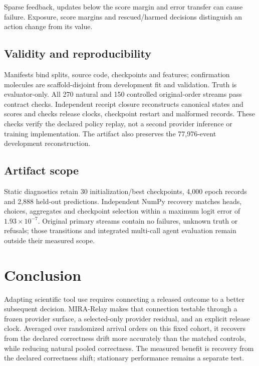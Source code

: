 \documentclass[sigconf,anonymous]{aamas}
\begin{document}
Sparse feedback, updates below the score margin and error transfer can cause failure. Exposure, score margins and rescued/harmed decisions distinguish an action change from its value.

\subsection{Validity and reproducibility}
Manifests bind splits, source code, checkpoints and features; confirmation molecules are scaffold-disjoint from development fit and validation. Truth is evaluator-only. All 270 natural and 150 controlled original-order streams pass contract checks. Independent receipt closure reconstructs canonical states and scores and checks release clocks, checkpoint restart and malformed records. These checks verify the declared policy replay, not a second provider inference or training implementation. The artifact also preserves the 77,976-event development reconstruction.

\subsection{Artifact scope}
Static diagnostics retain 30 initialization/best checkpoints, 4,000 epoch records and 2,888 held-out predictions. Independent NumPy recovery matches heads, choices, aggregates and checkpoint selection within a maximum logit error of $1.93\times10^{-7}$. Original primary streams contain no failures, unknown truth or refusals; those transitions and integrated multi-call agent evaluation remain outside their measured scope.

\section{Conclusion}
Adapting scientific tool use requires connecting a released outcome to a better subsequent decision. MIRA-Relay makes that connection testable through a frozen provider surface, a selected-only provider residual, and an explicit release clock. Averaged over randomized arrival orders on this fixed cohort, it recovers from the declared correctness drift more accurately than the matched controls, while reducing natural pooled correctness. The measured benefit is recovery from the declared correctness shift; stationary performance remains a separate test.

\clearpage
\balance


\end{document}
